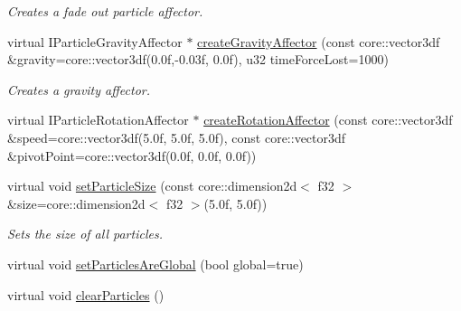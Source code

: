 \begin{DoxyCompactItemize}
\begin{DoxyCompactList}\small\item\em Creates a fade out particle affector. \end{DoxyCompactList}\item 
\hypertarget{classirr_1_1scene_1_1_c_particle_system_scene_node_a22bdd7bbc0e2a8bb0c235c0676ca098f}{virtual I\-Particle\-Gravity\-Affector $\ast$ \hyperlink{classirr_1_1scene_1_1_c_particle_system_scene_node_a22bdd7bbc0e2a8bb0c235c0676ca098f}{create\-Gravity\-Affector} (const core\-::vector3df \&gravity=core\-::vector3df(0.\-0f,-\/0.\-03f, 0.\-0f), u32 time\-Force\-Lost=1000)}\label{classirr_1_1scene_1_1_c_particle_system_scene_node_a22bdd7bbc0e2a8bb0c235c0676ca098f}

\begin{DoxyCompactList}\small\item\em Creates a gravity affector. \end{DoxyCompactList}\item 
virtual I\-Particle\-Rotation\-Affector $\ast$ \hyperlink{classirr_1_1scene_1_1_c_particle_system_scene_node_aacbba0af7c7d7e949c0bd4faf58b0f57}{create\-Rotation\-Affector} (const core\-::vector3df \&speed=core\-::vector3df(5.\-0f, 5.\-0f, 5.\-0f), const core\-::vector3df \&pivot\-Point=core\-::vector3df(0.\-0f, 0.\-0f, 0.\-0f))
\item 
\hypertarget{classirr_1_1scene_1_1_c_particle_system_scene_node_a3483f15f50c0b2c35ae0a56f03bd6214}{virtual void \hyperlink{classirr_1_1scene_1_1_c_particle_system_scene_node_a3483f15f50c0b2c35ae0a56f03bd6214}{set\-Particle\-Size} (const core\-::dimension2d$<$ f32 $>$ \&size=core\-::dimension2d$<$ f32 $>$(5.\-0f, 5.\-0f))}\label{classirr_1_1scene_1_1_c_particle_system_scene_node_a3483f15f50c0b2c35ae0a56f03bd6214}

\begin{DoxyCompactList}\small\item\em Sets the size of all particles. \end{DoxyCompactList}\item 
virtual void \hyperlink{classirr_1_1scene_1_1_c_particle_system_scene_node_afbf0c2398be2f73b5a6c1790ab5de5c4}{set\-Particles\-Are\-Global} (bool global=true)
\item 
\hypertarget{classirr_1_1scene_1_1_c_particle_system_scene_node_aa92262e15729c4f1bdedb3b119bad17f}{virtual void \hyperlink{classirr_1_1scene_1_1_c_particle_system_scene_node_aa92262e15729c4f1bdedb3b119bad17f}{clear\-Particles} ()}\label{classirr_1_1scene_1_1_c_particle_system_scene_node_aa92262e15729c4f1bdedb3b119bad17f}


\end{DoxyCompactItemize}
